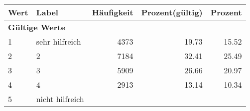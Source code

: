      \begin{longtable}{lXrrr}
     \toprule
     \textbf{Wert} & \textbf{Label} & \textbf{Häufigkeit} & \textbf{Prozent(gültig)} & \textbf{Prozent} \\
     \endhead
     \midrule
     \multicolumn{5}{l}{\textbf{Gültige Werte}}\\

     1 &
     \multicolumn{1}{X}{ sehr hilfreich   } &


       \num{4373} &
       \num[round-mode=places,round-precision=2]{19.73} &
         \num[round-mode=places,round-precision=2]{15.52} \\

     2 &
     \multicolumn{1}{X}{ 2   } &


       \num{7184} &
       \num[round-mode=places,round-precision=2]{32.41} &
         \num[round-mode=places,round-precision=2]{25.49} \\

     3 &
     \multicolumn{1}{X}{ 3   } &


       \num{5909} &
       \num[round-mode=places,round-precision=2]{26.66} &
         \num[round-mode=places,round-precision=2]{20.97} \\

     4 &
     \multicolumn{1}{X}{ 4   } &


       \num{2913} &
       \num[round-mode=places,round-precision=2]{13.14} &
         \num[round-mode=places,round-precision=2]{10.34} \\

     5 &
     \multicolumn{1}{X}{ nicht hilfreich   } &



\end{longtable}
